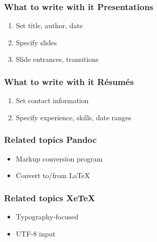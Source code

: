 \documentclass{beamer}
\begin{document}
\begin{frame}[t]
    \frametitle{What to write with it \textendash{} Presentations}
    
    \begin{enumerate}
        \item Set title, author, date
        \item Specify slides
        \item Slide entrances, transitions
    \end{enumerate}
\end{frame}

\begin{frame}[t]
    \frametitle{What to write with it \textendash{} R\'{e}sum\'{e}s}
    
    \begin{enumerate}
        \item Set contact information
        \item Specify experience, skills, date ranges
    \end{enumerate}
\end{frame}

\begin{frame}
    \frametitle{Related topics \textendash{} Pandoc}
    \begin{itemize}
        \item Markup conversion program
        \item Convert to/from \LaTeX{}
    \end{itemize}
\end{frame}

\begin{frame}
    \frametitle{Related topics \textendash{} XeTeX}
    \begin{itemize}
        \item Typography-focused
        \item UTF-8 input
    \end{itemize}
\end{frame}
\end{document}
